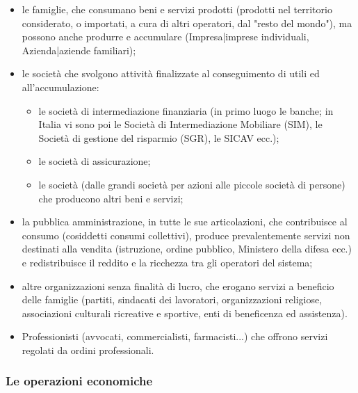 \begin{itemize} [noitemsep]
\item le famiglie, che consumano beni e servizi prodotti (prodotti nel 
territorio considerato, o importati, a cura di altri operatori, dal "resto del 
mondo"), ma possono anche produrre e accumulare (Impresa|imprese 
individuali, Azienda|aziende familiari);
\item le società che svolgono attività finalizzate al 
conseguimento di utili ed all'accumulazione:
  \begin{itemize} [noitemsep]
  \item le società di intermediazione finanziaria (in primo luogo le banche; 
  in Italia vi sono poi le Società di Intermediazione Mobiliare (SIM), le 
  Società di gestione del risparmio (SGR), le SICAV ecc.);
  \item le società di assicurazione;
  \item le società (dalle grandi società per azioni alle piccole società di 
  persone) che producono altri beni e servizi;
  \end{itemize}
\item la pubblica amministrazione, in tutte le sue articolazioni, che 
contribuisce al consumo (cosiddetti consumi collettivi), produce 
prevalentemente servizi non destinati alla vendita (istruzione, ordine 
pubblico, 
Ministero della difesa ecc.) e redistribuisce il reddito e la ricchezza 
tra gli operatori del sistema;
\item altre organizzazioni senza finalità di lucro, che erogano servizi a 
beneficio 
delle famiglie (partiti, sindacati dei 
lavoratori, organizzazioni religiose, associazioni culturali ricreative e 
sportive, enti di beneficenza ed assistenza).
\item Professionisti (avvocati, commercialisti, farmacisti...) che offrono 
servizi 
regolati da ordini professionali.
\end{itemize}

\subsubsection{Le operazioni economiche}

